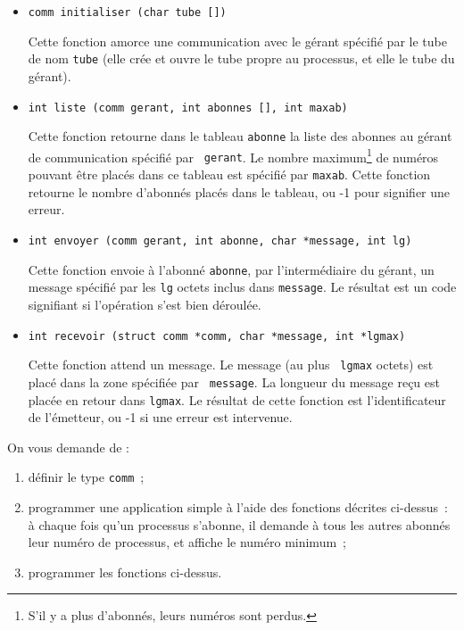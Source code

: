 \begin {itemize}

    \item \verb:comm initialiser (char tube []):

	Cette fonction amorce une communication avec le gérant spécifié
	par le tube de nom {\tt tube} (elle crée et ouvre le tube propre
	au processus, et elle le tube du gérant).

    \item \verb:int liste (comm gerant, int abonnes [], int maxab):

	Cette fonction retourne dans le tableau {\tt abonne} la liste
	des abonnes au gérant de communication spécifié par {\tt
	gerant}.  Le nombre maximum\footnote {S'il y a plus d'abonnés,
	leurs numéros sont perdus.} de numéros pouvant être placés dans
	ce tableau est spécifié par {\tt maxab}. Cette fonction retourne
	le nombre d'abonnés placés dans le tableau, ou -1 pour signifier
	une erreur.
    
    \item \verb:int envoyer (comm gerant, int abonne, char *message, int lg):

	Cette fonction envoie à l'abonné {\tt abonne}, par
	l'intermédiaire du gérant, un message spécifié par les {\tt lg}
	octets inclus dans {\tt message}.  Le résultat est un code
	signifiant si l'opération s'est bien déroulée.

    \item \verb:int recevoir (struct comm *comm, char *message, int *lgmax):

	Cette fonction attend un message. Le message (au plus {\tt
	lgmax} octets) est placé dans la zone spécifiée par {\tt
	message}. La longueur du message reçu est placée en retour dans
	{\tt lgmax}. Le résultat de cette fonction est l'identificateur
	de l'émetteur, ou -1 si une erreur est intervenue.

\end {itemize}

On vous demande de :

\begin {enumerate}

    \item définir le type {\tt comm}~;

    \item programmer une application simple à l'aide des fonctions
	décrites ci-dessus~: à chaque fois qu'un processus s'abonne, il
	demande à tous les autres abonnés leur numéro de processus, et
	affiche le numéro minimum~;
    
    \item programmer les fonctions ci-dessus.

\end {enumerate}



